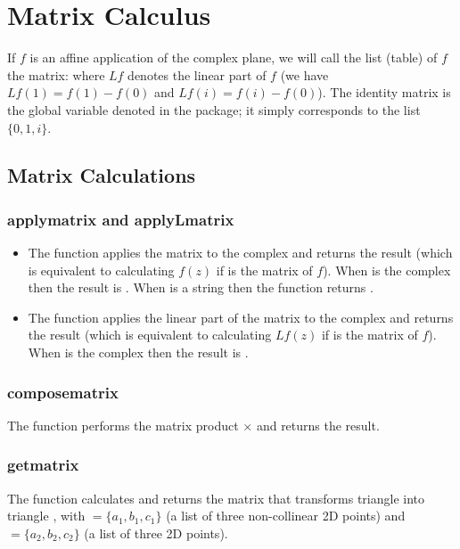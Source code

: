 \section{Matrix Calculus}

If $f$ is an affine application of the complex plane, we will call the list (table) of $f$ the matrix:
where $Lf$ denotes the linear part of $f$ (we have $Lf(1) = f(1)-f(0)$ and $Lf(i) = f(i)-f(0)$). The identity matrix is the global variable denoted  in the \luadrawenv package; it simply corresponds to the list $\{0,1,i\}$.

\subsection{Matrix Calculations}

\subsubsection{applymatrix and applyLmatrix}
\begin{itemize}
    \item The function  applies the matrix  to the complex  and returns the result (which is equivalent to calculating $f(z)$ if  is the matrix of $f$). When  is the complex  then the result is . When  is a string then the function returns .

    \item The function  applies the linear part of the matrix  to the complex  and returns the result (which is equivalent to calculating $Lf(z)$ if  is the matrix of $f$). When  is the complex  then the result is .
\end{itemize}

\subsubsection{composematrix}
The function  performs the matrix product $\times$ and returns the result.

\subsubsection{getmatrix}
The function  calculates and returns the matrix that transforms triangle  into triangle , with $=\{a_1,b_1,c_1\}$ (a list of three non-collinear 2D points) and $=\{a_2,b_2,c_2\}$ (a list of three 2D points).


